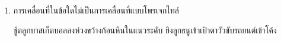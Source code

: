 \begin{enumerate}
	\item \runningj {} การเคลื่อนที่ในข้อใดไม่เป็นการเคลื่อนที่แบบโพรเจกไทล์
	\begin{2c}
		{ชู้ตลูกบาสเก็ตบอลลงห่วง}{ขว้างก้อนหินในแนวระดับ}
		{ยิงลูกธนูเข้าเป้าตาวัว}{ขับรถยนต์เข้าโค้ง}
	\end{2c}
\end{enumerate}
